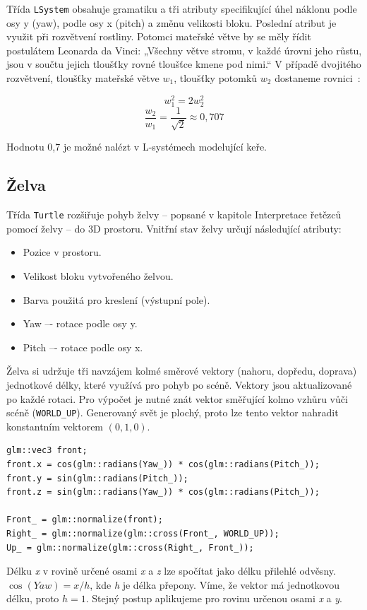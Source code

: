\documentclass[thesis=M,czech]{FITthesis}[2019/12/23]
\begin{document}
Třída \texttt{LSystem} obsahuje gramatiku a tři atributy specifikující úhel náklonu podle osy y (yaw), podle osy x (pitch) a změnu velikosti bloku. Poslední atribut je využit při rozvětvení rostliny. Potomci mateřské větve by se měly řídit postulátem Leonarda da Vinci: „Všechny větve stromu, v každé úrovni jeho růstu, jsou v součtu jejich tloušťky rovné tloušťce kmene pod nimi.“ V případě dvojitého rozvětvení, tloušťky mateřské větve $w_1$, tloušťky potomků $w_2$ dostaneme rovnici~\cite{abop57}:

\[ w_1^2 = 2w_2^2 \]
\[ \frac{w_2}{w_1} = \frac{1}{\sqrt{2}} \approx 0,707\]

Hodnotu 0,7 je možné nalézt v L-systémech modelující keře.

\subsection{Želva}
Třída \texttt{Turtle} rozšiřuje pohyb želvy -- popsané v kapitole Interpretace řetězců pomocí želvy -- do 3D prostoru. Vnitřní stav želvy určují následující atributy:

\begin{itemize}
\item Pozice v prostoru.
\item Velikost bloku vytvořeného želvou.
\item Barva použitá pro kreslení (výstupní pole).
\item Yaw –- rotace podle osy y.
\item Pitch –- rotace podle osy x.
\end{itemize}

Želva si udržuje tři navzájem kolmé směrové vektory (nahoru, dopředu, doprava) jednotkové délky, které využívá pro pohyb po scéně. Vektory jsou aktualizované po každé rotaci. Pro výpočet je nutné znát vektor směřující kolmo vzhůru vůči scéně (\texttt{WORLD\_UP}). Generovaný svět je plochý, proto lze tento vektor nahradit konstantním vektorem $(0, 1, 0)$.

\begin{verbatim}
glm::vec3 front;
front.x = cos(glm::radians(Yaw_)) * cos(glm::radians(Pitch_));
front.y = sin(glm::radians(Pitch_));
front.z = sin(glm::radians(Yaw_)) * cos(glm::radians(Pitch_));

Front_ = glm::normalize(front);
Right_ = glm::normalize(glm::cross(Front_, WORLD_UP));
Up_ = glm::normalize(glm::cross(Right_, Front_));
\end{verbatim}

Délku \textit{x} v rovině určené osami \textit{x} a \textit{z} lze spočítat jako délku přilehlé odvěsny. $\cos(Yaw) = x / h$, kde \textit{h} je délka přepony. Víme, že vektor má jednotkovou délku, proto $h = 1$. Stejný postup aplikujeme pro rovinu určenou osami \textit{x} a \textit{y}.
\end{document}
